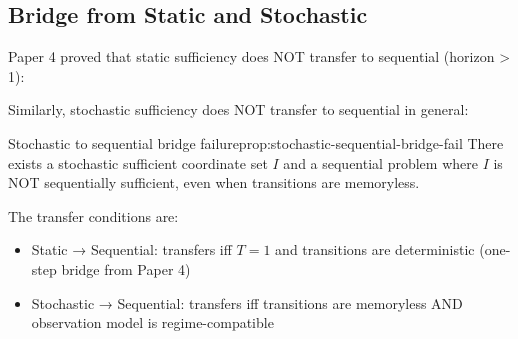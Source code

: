 
\subsection{Bridge from Static and Stochastic}

Paper 4 proved that static sufficiency does NOT transfer to sequential (horizon > 1):

Similarly, stochastic sufficiency does NOT transfer to sequential in general:

\begin{claim}{Stochastic to sequential bridge failure}{prop:stochastic-sequential-bridge-fail}
There exists a stochastic sufficient coordinate set $I$ and a sequential problem where $I$ is NOT sequentially sufficient, even when transitions are memoryless.
\end{claim}


The transfer conditions are:
\begin{itemize}
\item Static → Sequential: transfers iff $T = 1$ and transitions are deterministic (one-step bridge from Paper 4)
\item Stochastic → Sequential: transfers iff transitions are memoryless AND observation model is regime-compatible
\end{itemize}
